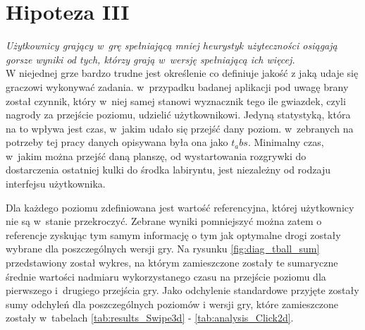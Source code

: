 \documentclass[a4paper,12pt,numbers=noenddot]{report}
\begin{document}
\section{Hipoteza III}
\textit{Użytkownicy grający w~grę spełniającą mniej heurystyk użyteczności osiągają gorsze wyniki od tych, którzy grają w~wersję spełniającą ich więcej.}\\

W niejednej grze bardzo trudne jest określenie co definiuje jakość z jaką udaje się graczowi wykonywać zadania. w~przypadku badanej aplikacji pod uwagę brany został czynnik, który w~niej samej stanowi wyznacznik tego ile gwiazdek, czyli nagrody za przejście poziomu, udzielić użytkownikowi. Jedyną statystyką, która na to wpływa jest czas, w~jakim udało się przejść dany poziom. w~zebranych na potrzeby tej pracy danych opisywana była ona jako $t_abs$. Minimalny czas, w~jakim można przejść daną planszę, od wystartowania rozgrywki do dostarczenia ostatniej kulki do środka labiryntu, jest niezależny od rodzaju interfejsu użytkownika. 

Dla każdego poziomu zdefiniowana jest wartość referencyjna, której użytkownicy nie są w~stanie przekroczyć. Zebrane wyniki pomniejszyć można zatem o referencje zyskując tym samym informację o tym jak optymalne drogi zostały wybrane dla poszczególnych wersji gry. Na rysunku \ref{fig:diag_tball_sum} przedstawiony został wykres, na którym zamieszczone zostały te sumaryczne średnie wartości nadmiaru wykorzystanego czasu na przejście poziomu dla pierwszego i~drugiego przejścia gry. Jako odchylenie standardowe przyjęte zostały sumy odchyleń dla poszczególnych poziomów i wersji gry, które zamieszczone zostały w~tabelach \ref{tab:results_Swipe3d} - \ref{tab:analysis_Click2d}.\\
\end{document}
